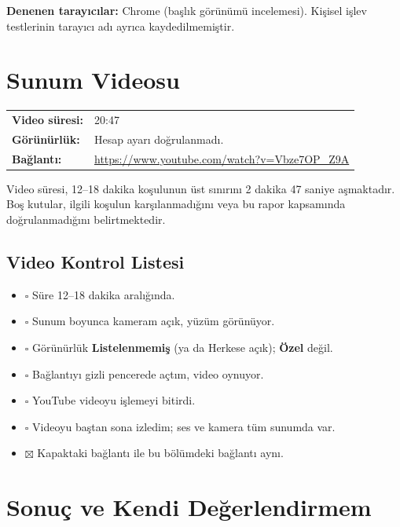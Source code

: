 \documentclass[12pt,a4paper]{article}
\newcommand{\youtubelink}{\url{https://www.youtube.com/watch?v=Vbze7OP_Z9A}}
\begin{document}
\textbf{Denenen tarayıcılar:} Chrome (başlık görünümü incelemesi). Kişisel işlev testlerinin tarayıcı adı ayrıca kaydedilmemiştir.

\section{Sunum Videosu}
\begin{center}
\begin{tabular}{@{}ll@{}}
\textbf{Video süresi:} & 20:47 \quad  \\
\textbf{Görünürlük:} & Hesap ayarı doğrulanmadı. \\
\textbf{Bağlantı:} & \youtubelink \\
\end{tabular}
\end{center}

Video süresi, 12--18 dakika koşulunun üst sınırını 2 dakika 47 saniye aşmaktadır. Boş kutular, ilgili koşulun karşılanmadığını veya bu rapor kapsamında doğrulanmadığını belirtmektedir.

\subsection{Video Kontrol Listesi}

\begin{itemize}[label={}]
  \item $\square$ Süre 12--18 dakika aralığında.
  \item $\square$ Sunum boyunca kameram açık, yüzüm görünüyor.
  \item $\square$ Görünürlük \textbf{Listelenmemiş} (ya da Herkese açık); \textbf{Özel} değil.
  \item $\square$ Bağlantıyı gizli pencerede açtım, video oynuyor.
  \item $\square$ YouTube videoyu işlemeyi bitirdi.
  \item $\square$ Videoyu baştan sona izledim; ses ve kamera tüm sunumda var.
  \item $\boxtimes$ Kapaktaki bağlantı ile bu bölümdeki bağlantı aynı.
\end{itemize}

\section{Sonuç ve Kendi Değerlendirmem}
\end{document}
